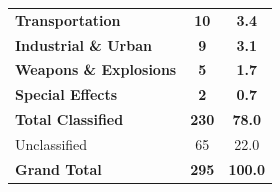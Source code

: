 \begin{table}[h!]
\begin{tabularx}{\linewidth}{l S[table-format=3.0] S[table-format=2.1]}
        \addlinespace
        
        \textbf{Transportation} & \textbf{10} & \textbf{3.4} \\
        
        \addlinespace
        
        \textbf{Industrial \& Urban} & \textbf{9} & \textbf{3.1} \\
        
        \addlinespace
        
        \textbf{Weapons \& Explosions} & \textbf{5} & \textbf{1.7} \\

        \addlinespace

        \textbf{Special Effects} & \textbf{2} & \textbf{0.7} \\

        \midrule
        
        \textbf{Total Classified} & \textbf{230} & \textbf{78.0} \\
        Unclassified & 65 & 22.0 \\
        \midrule
        \textbf{Grand Total} & \textbf{295} & \textbf{100.0} \\
        
        \bottomrule
    \end{tabularx}
\end{table}

